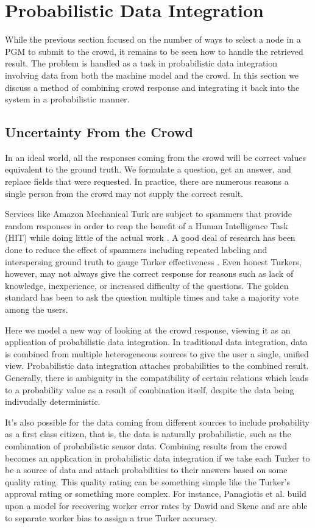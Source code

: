 \section{Probabilistic Data Integration}

While the previous section focused on the number of ways to select a node in a PGM to submit to the crowd, it remains to be seen how to handle the retrieved result.  The problem is handled as a task in probabilistic data integration involving data from both the machine model and the crowd.  In this section we discuss a method of combining crowd response and integrating it back into the system in a probabilistic manner.

\subsection{Uncertainty From the Crowd}
In an ideal world, all the responses coming from the crowd will be correct values equivalent to the ground truth.  We formulate a question, get an answer, and replace fields that were requested.  In practice, there are numerous reasons a single person from the crowd may not supply the correct result.

Services like Amazon Mechanical Turk are subject to spammers that provide random responses in order to reap the benefit of a Human Intelligence Task (HIT) while doing little of the actual work \cite{Panos10}.  A good deal of research has been done to reduce the effect of spammers including repeated labeling \cite{Sheng:2008:GLI:1401890.1401965} and interspersing ground truth to gauge Turker effectiveness \cite{quinn10}.  Even honest Turkers, however, may not always give the correct response for reasons such as lack of knowledge, inexperience, or increased difficulty of the questions.  The golden standard has been to ask the question multiple times and take a majority vote among the users. 

Here we model a new way of looking at the crowd response, viewing it as an application of probabilistic data integration.  In traditional data integration, data is combined from multiple heterogeneous sources to give the user a single, unified view.  Probabilistic data integration attaches probabilities to the combined result.  Generally, there is ambiguity in the compatibility of certain relations which leads to a probability value as a result of combination itself, despite the data being indivudally deterministic.

It's also possible for the data coming from different sources to include probability as a first class citizen, that is, the data is naturally probabilistic, such as the combination of probabilistic sensor data.  Combining results from the crowd becomes an application in probabilistic data integration if we take each Turker to be a source of data and attach probabilities to their answers based on some quality rating.  This quality rating can be something simple like the Turker's approval rating or something more complex.  For instance, Panagiotis et al. \cite{Ipeirotis:2010:QMA:1837885.1837906} build upon a model for recovering worker error rates by Dawid and Skene \cite{dawid79} and are able to separate worker bias to assign a true Turker accuracy.

